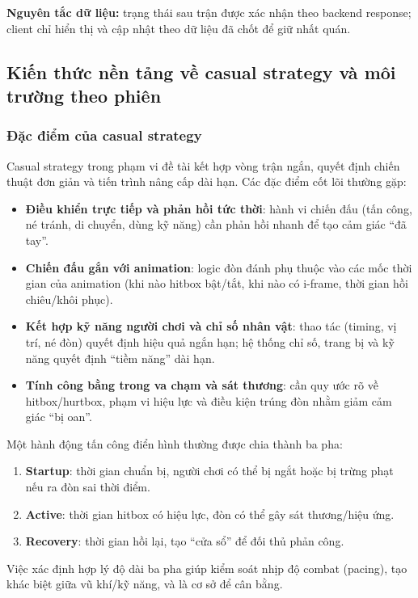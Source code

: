 \textbf{Nguyên tắc dữ liệu:} trạng thái sau trận được xác nhận theo backend response; client chỉ hiển thị và cập nhật theo dữ liệu đã chốt để giữ nhất quán.

\subsection{Kiến thức nền tảng về casual strategy và môi trường theo phiên}

\subsubsection{Đặc điểm của casual strategy}

Casual strategy trong phạm vi đề tài kết hợp vòng trận ngắn, quyết định chiến thuật đơn giản và tiến trình nâng cấp dài hạn. Các đặc điểm cốt lõi thường gặp\cite{adams-game-design,schell-art}:

\begin{itemize}
    \item \textbf{Điều khiển trực tiếp và phản hồi tức thời}: hành vi chiến đấu (tấn công, né tránh, di chuyển, dùng kỹ năng) cần phản hồi nhanh để tạo cảm giác ``đã tay''.
    \item \textbf{Chiến đấu gắn với animation}: logic đòn đánh phụ thuộc vào các mốc thời gian của animation (khi nào hitbox bật/\allowbreak tắt, khi nào có i-frame, thời gian hồi chiêu/\allowbreak khôi phục).
    \item \textbf{Kết hợp kỹ năng người chơi và chỉ số nhân vật}: thao tác (timing, vị trí, né đòn) quyết định hiệu quả ngắn hạn; hệ thống chỉ số, trang bị và kỹ năng quyết định ``tiềm năng'' dài hạn.
    \item \textbf{Tính công bằng trong va chạm và sát thương}: cần quy ước rõ về hitbox/\allowbreak hurtbox, phạm vi hiệu lực và điều kiện trúng đòn nhằm giảm cảm giác ``bị oan''.
\end{itemize}

Một hành động tấn công điển hình thường được chia thành ba pha\cite{adams-game-design}:
\begin{enumerate}
    \item \textbf{Startup}: thời gian chuẩn bị, người chơi có thể bị ngắt hoặc bị trừng phạt nếu ra đòn sai thời điểm.
    \item \textbf{Active}: thời gian hitbox có hiệu lực, đòn có thể gây sát thương/\allowbreak hiệu ứng.
    \item \textbf{Recovery}: thời gian hồi lại, tạo ``cửa sổ'' để đối thủ phản công.
\end{enumerate}
Việc xác định hợp lý độ dài ba pha giúp kiểm soát nhịp độ combat (pacing), tạo khác biệt giữa vũ khí/\allowbreak kỹ năng, và là cơ sở để cân bằng.

